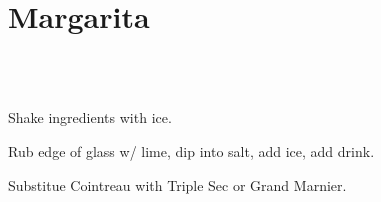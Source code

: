 \section{Margarita}


\begin{recipestats}[
	servings=1,
	preptime=5 \minute,
	vegetarian=vegan,
]
\end{recipestats}


\begin{ingredientcolumns}[1]
	\begin{ingredientblock}
		\\
		\\
	\end{ingredientblock}
\end{ingredientcolumns}


\begin{preparation}
\item Shake ingredients with ice.
\item Rub edge of glass w/ lime, dip into salt, add ice, add drink.
\end{preparation}


\begin{variation}
\item Substitue Cointreau with Triple Sec or Grand Marnier.
\end{variation}

\recipeend
